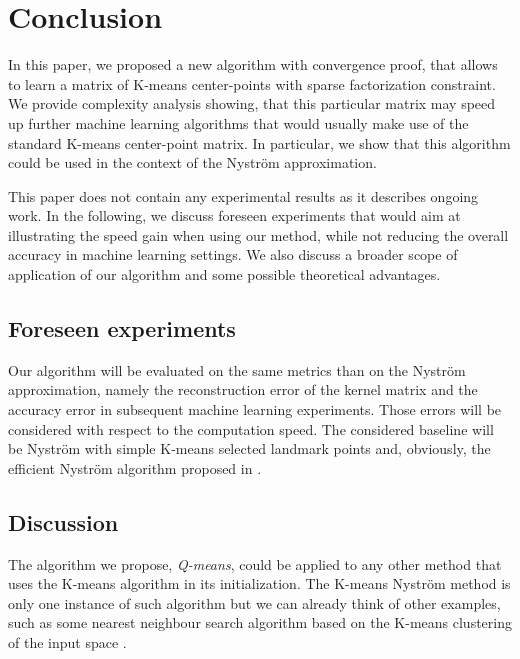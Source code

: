 \section{Conclusion}
\label{sec:conclusion}

In this paper, we proposed a new algorithm with convergence proof, that allows to learn a matrix of K-means center-points with sparse factorization constraint. We provide complexity analysis showing, that this particular matrix may speed up further machine learning algorithms that would usually make use of the standard K-means center-point matrix. In particular, we show that this algorithm could be used in the context of the Nyström approximation.

This paper does not contain any experimental results as it describes ongoing work. In the following, %
we discuss foreseen experiments that would aim at illustrating the speed gain when using our method, while not reducing the overall accuracy in machine learning settings.
%
We also discuss a broader scope of application of our algorithm and some possible theoretical advantages.

\subsection{Foreseen experiments}
\label{sec:foreseen_experiments}

Our algorithm will be evaluated on the same metrics than \cite{si2016computationally} on the Nyström approximation, namely the reconstruction error of the kernel matrix and the accuracy error in subsequent machine learning experiments. Those errors will be considered with respect to the computation speed. The considered baseline will be Nyström with simple K-means selected landmark points and, obviously, the efficient Nyström algorithm proposed in \cite{si2016computationally}.

\subsection{Discussion}
\label{sec:discussion}

The algorithm we propose, \textit{Q-means}, could be applied to any other method that uses the K-means algorithm in its initialization. The K-means Nyström method is only one instance of such algorithm but we can already think of other examples, such as some nearest neighbour search algorithm based on the K-means clustering of the input space \cite{wang2011fast}.

